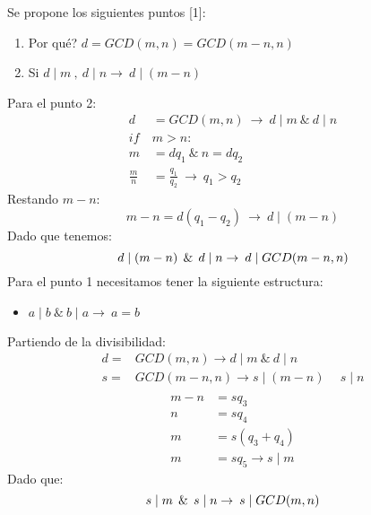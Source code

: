 \documentclass[a4paper,10pt]{article}
\begin{document}
Se propone los siguientes puntos [1]:
\begin{enumerate}
 \item \textquestiondown Por qu\'e? $d=GCD(m,n)=GCD(m-n,n)$
 \item Si $ d\mid m\: ,\: d\mid n \rightarrow \: d\mid (m-n)$ 
\end{enumerate}
Para el punto 2:
\begin{equation*}
 \begin{align}
  d&=GCD(m,n)\: \rightarrow \: d\mid m \:\&\:d\mid n\\
  if\:&m>n:\\
  m&=dq_1 \: \& \: n=dq_2 \\
  \frac{m}{n} &=\frac{q_1}{q_2} \: \rightarrow \: q_1>q_2
 \end{align}
\end{equation*}
Restando $m-n$:
\begin{equation}
 m-n=d(q_1-q_2)\: \rightarrow \: d\mid (m-n)
\end{equation}
Dado que tenemos:
\begin{equation}
 d \mid (m-n) \:\:\&\:\: d\mid n \rightarrow \:d\mid GCD(m-n,n) \\
\end{equation}
Para el punto 1 necesitamos tener la siguiente estructura:
\begin{itemize}
 \item $a\mid b \:\&\:b\mid a\rightarrow\:a=b$
\end{itemize}
Partiendo de la divisibilidad:
\begin{equation*}
 \begin{align}
  d=&GCD(m,n) \rightarrow d\mid m \:\&\: d\mid n \\
  s=&GCD(m-n,n) \rightarrow s\mid(m-n) \:&\: s\mid n \\
 \end{align}
\end{equation*}
\begin{equation*}
 \begin{align}
  m-n&=sq_3\\
  n&=sq_4\\
  m&=s(q_3+q_4)\\
  m&=sq_5 \rightarrow s\mid m
 \end{align}
\end{equation*}
Dado que:
\begin{equation}
  s \mid m \:\:\&\:\: s\mid n \rightarrow \:s\mid GCD(m,n) \\
\end{equation}
\end{document}

